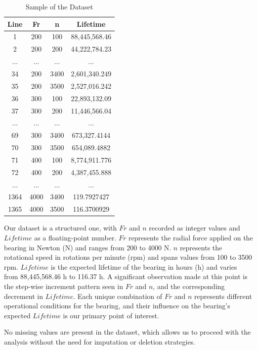 \begin{table}[ht]
  \centering
  \caption{Sample of the Dataset}
  \label{table:bearings-dataset}
  \begin{tabular}{|c|c|c|c|}
  \hline
  Line & Fr & n & Lifetime \\
  \hline
  1 & 200 & 100 & 88,445,568.46 \\
  2 & 200 & 200 & 44,222,784.23 \\
  ... & ... & ... & ... \\
  34 & 200 & 3400 & 2,601,340.249 \\
  35 & 200 & 3500 & 2,527,016.242 \\
  36 & 300 & 100 & 22,893,132.09 \\
  37 & 300 & 200 & 11,446,566.04 \\
  ... & ... & ... & ... \\
  69 & 300 & 3400 & 673,327.4144 \\
  70 & 300 & 3500 & 654,089.4882 \\
  71 & 400 & 100 & 8,774,911.776 \\
  72 & 400 & 200 & 4,387,455.888 \\
  ... & ... & ... & ... \\
  1364 & 4000 & 3400 & 119.7927427 \\
  1365 & 4000 & 3500 & 116.3700929 \\
  \hline
  \end{tabular}
\end{table}

Our dataset is a structured one, with \(Fr\) and \(n\) recorded as integer values and \(Lifetime\) as a floating-point number. \(Fr\) represents the radial force applied on the bearing in Newton (N) and ranges from 200 to 4000 N. \(n\) represents the rotational speed in rotations per minute (rpm) and spans values from 100 to 3500 rpm. \(Lifetime\) is the expected lifetime of the bearing in hours (h) and varies from 88,445,568.46 h to 116.37 h. A significant observation made at this point is the step-wise increment pattern seen in \(Fr\) and \(n\), and the corresponding decrement in \(Lifetime\). Each unique combination of \(Fr\) and \(n\) represents different operational conditions for the bearing, and their influence on the bearing's expected \(Lifetime\) is our primary point of interest.

No missing values are present in the dataset, which allows us to proceed with the analysis without the need for imputation or deletion strategies.


